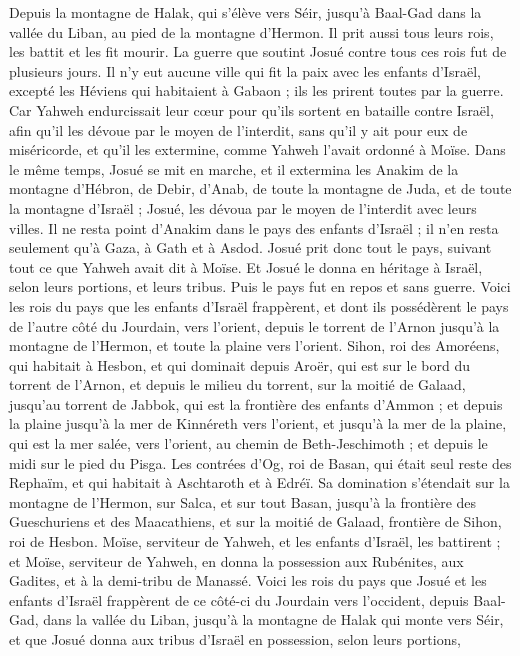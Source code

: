 \begin{multicols}{2}
Depuis la montagne de Halak, qui s’élève vers Séir, jusqu’à Baal-Gad dans la vallée du Liban, au pied de la montagne d’Hermon. Il prit aussi tous leurs rois, les battit et les fit mourir.
La guerre que soutint Josué contre tous ces rois fut de plusieurs jours.
Il n’y eut aucune ville qui fit la paix avec les enfants d’Israël, excepté les Héviens qui habitaient à Gabaon ; ils les prirent toutes par la guerre.
Car Yahweh endurcissait leur cœur pour qu’ils sortent en bataille contre Israël, afin qu’il les dévoue par le moyen de l'interdit, sans qu’il y ait pour eux de miséricorde, et qu’il les extermine, comme Yahweh l’avait ordonné à Moïse.
Dans le même temps, Josué se mit en marche, et il extermina les Anakim de la montagne d’Hébron, de Debir, d’Anab, de toute la montagne de Juda, et de toute la montagne d’Israël ; Josué, les dévoua par le moyen de l'interdit avec leurs villes.
Il ne resta point d’Anakim dans le pays des enfants d’Israël ; il n’en resta seulement qu’à Gaza, à Gath et à Asdod.
Josué prit donc tout le pays, suivant tout ce que Yahweh avait dit à Moïse. Et Josué le donna en héritage à Israël, selon leurs portions, et leurs tribus. Puis le pays fut en repos et sans guerre.
\VerseOne{}Voici les rois du pays que les enfants d’Israël frappèrent, et dont ils possédèrent le pays de l’autre côté du Jourdain, vers l’orient, depuis le torrent de l’Arnon jusqu’à la montagne de l’Hermon, et toute la plaine vers l’orient.
Sihon, roi des Amoréens, qui habitait à Hesbon, et qui dominait depuis Aroër, qui est sur le bord du torrent de l’Arnon, et depuis le milieu du torrent, sur la moitié de Galaad, jusqu’au torrent de Jabbok, qui est la frontière des enfants d’Ammon ;
et depuis la plaine jusqu’à la mer de Kinnéreth vers l’orient, et jusqu’à la mer de la plaine, qui est la mer salée, vers l’orient, au chemin de Beth-Jeschimoth ; et depuis le midi sur le pied du Pisga.
Les contrées d’Og, roi de Basan, qui était seul reste des Rephaïm, et qui habitait à Aschtaroth et à Edréï.
Sa domination s’étendait sur la montagne de l’Hermon, sur Salca, et sur tout Basan, jusqu’à la frontière des Gueschuriens et des Maacathiens, et sur la moitié de Galaad, frontière de Sihon, roi de Hesbon.
Moïse, serviteur de Yahweh, et les enfants d’Israël, les battirent ; et Moïse, serviteur de Yahweh, en donna la possession aux Rubénites, aux Gadites, et à la demi-tribu de Manassé.
Voici les rois du pays que Josué et les enfants d’Israël frappèrent de ce côté-ci du Jourdain vers l’occident, depuis Baal-Gad, dans la vallée du Liban, jusqu’à la montagne de Halak qui monte vers Séir, et que Josué donna aux tribus d’Israël en possession, selon leurs portions,

\end{multicols}
